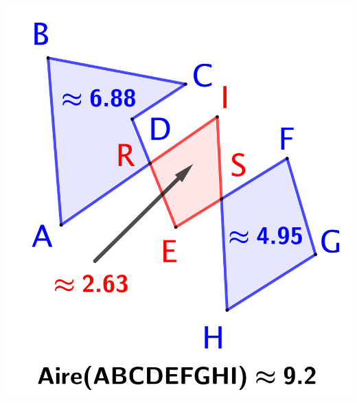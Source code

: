 \begin{center}
    \includegraphics[scale=.35]{content/polygon/at-least-one/garea-trick.png}
\end{center}


